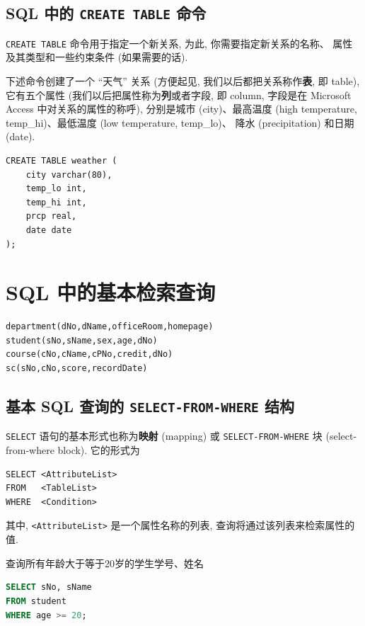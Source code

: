 \documentclass[10pt,UTF8]{book} %
\begin{document}
\subsection{SQL 中的 \lstinline|CREATE TABLE| 命令}

\lstinline|CREATE TABLE| 命令用于指定一个新关系, 为此, 你需要指定新关系的名称、
属性及其类型和一些约束条件 (如果需要的话).

\begin{example} 
    下述命令创建了一个 “天气” 关系 (方便起见, 我们以后都把关系称作\textbf{表}, 即 table),
    它有五个属性 (我们以后把属性称为\textbf{列}或者字段, 即 column, 字段是在
    Microsoft Access 中对关系的属性的称呼), 分别是城市 (city)、最高温度 (high temperature, temp\_hi)、最低温度 (low temperature, temp\_lo)、
    降水 (precipitation) 和日期 (date).
\begin{lstlisting}
CREATE TABLE weather (
    city varchar(80),
    temp_lo int,
    temp_hi int,
    prcp real,
    date date
);
\end{lstlisting}
\end{example}

\section{SQL 中的基本检索查询}

\begin{lstlisting}
department(dNo,dName,officeRoom,homepage)
student(sNo,sName,sex,age,dNo)
course(cNo,cName,cPNo,credit,dNo)
sc(sNo,cNo,score,recordDate)
\end{lstlisting}


\subsection{基本 SQL 查询的 \lstinline|SELECT-FROM-WHERE| 结构}

\lstinline|SELECT| 语句的基本形式也称为\textbf{映射} (mapping) 或
\lstinline|SELECT-FROM-WHERE| 块 (select-from-where block). 它的形式为
\begin{lstlisting}
SELECT <AttributeList>
FROM   <TableList>
WHERE  <Condition>
\end{lstlisting}
其中, \lstinline|<AttributeList>| 是一个属性名称的列表, 查询将通过该列表来检索属性的值.

\begin{example}
    查询所有年龄大于等于20岁的学生学号、姓名
\begin{lstlisting}[language=SQL]
SELECT sNo, sName
FROM student
WHERE age >= 20;
\end{lstlisting}
\end{example}
\end{document}
